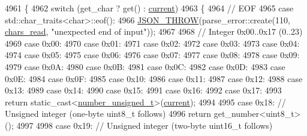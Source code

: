 \begin{DoxyCode}
4961     \{
4962         \textcolor{keywordflow}{switch} (get\_char ? \textcolor{keyword}{get}() : \hyperlink{classnlohmann_1_1detail_1_1binary__reader_a7e994e201b215cd6d6ae28a1853f43e0}{current})
4963         \{
4964             \textcolor{comment}{// EOF}
4965             \textcolor{keywordflow}{case} std::char\_traits<char>::eof():
4966                 \hyperlink{json_8hpp_a6c274f6db2e65c1b66c7d41b06ad690f}{JSON\_THROW}(parse\_error::create(110, \hyperlink{classnlohmann_1_1detail_1_1binary__reader_a2dbde0b7390100efe0bfc54e21c3a34b}{chars\_read}, \textcolor{stringliteral}{"unexpected end of
       input"}));
4967 
4968             \textcolor{comment}{// Integer 0x00..0x17 (0..23)}
4969             \textcolor{keywordflow}{case} 0x00:
4970             \textcolor{keywordflow}{case} 0x01:
4971             \textcolor{keywordflow}{case} 0x02:
4972             \textcolor{keywordflow}{case} 0x03:
4973             \textcolor{keywordflow}{case} 0x04:
4974             \textcolor{keywordflow}{case} 0x05:
4975             \textcolor{keywordflow}{case} 0x06:
4976             \textcolor{keywordflow}{case} 0x07:
4977             \textcolor{keywordflow}{case} 0x08:
4978             \textcolor{keywordflow}{case} 0x09:
4979             \textcolor{keywordflow}{case} 0x0A:
4980             \textcolor{keywordflow}{case} 0x0B:
4981             \textcolor{keywordflow}{case} 0x0C:
4982             \textcolor{keywordflow}{case} 0x0D:
4983             \textcolor{keywordflow}{case} 0x0E:
4984             \textcolor{keywordflow}{case} 0x0F:
4985             \textcolor{keywordflow}{case} 0x10:
4986             \textcolor{keywordflow}{case} 0x11:
4987             \textcolor{keywordflow}{case} 0x12:
4988             \textcolor{keywordflow}{case} 0x13:
4989             \textcolor{keywordflow}{case} 0x14:
4990             \textcolor{keywordflow}{case} 0x15:
4991             \textcolor{keywordflow}{case} 0x16:
4992             \textcolor{keywordflow}{case} 0x17:
4993                 \textcolor{keywordflow}{return} \textcolor{keyword}{static\_cast<}\hyperlink{classnlohmann_1_1detail_1_1binary__reader_a6e87a28ccbfdb4afcc2c93df9f9dbe74}{number\_unsigned\_t}\textcolor{keyword}{>}(\hyperlink{classnlohmann_1_1detail_1_1binary__reader_a7e994e201b215cd6d6ae28a1853f43e0}{current});
4994 
4995             \textcolor{keywordflow}{case} 0x18: \textcolor{comment}{// Unsigned integer (one-byte uint8\_t follows)}
4996                 \textcolor{keywordflow}{return} get\_number<uint8\_t>();
4997 
4998             \textcolor{keywordflow}{case} 0x19: \textcolor{comment}{// Unsigned integer (two-byte uint16\_t follows)}

\end{DoxyCode}
